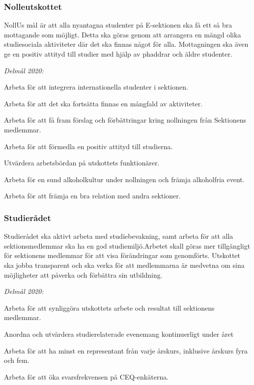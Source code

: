 \documentclass[../_main/handlingar.tex]{subfiles}
\begin{document}
\subsubsection*{Nolleutskottet}
NollUs mål är att alla nyantagna studenter på E-sektionen ska få ett så bra mottagande som möjligt. Detta ska göras genom att arrangera en mängd olika studiesociala aktiviteter där det ska finnas något för alla. Mottagningen ska även ge en positiv attityd till studier med hjälp av phaddrar och äldre studenter. 

\emph{Delmål 2020:}
\begin{dashlist}
	\item Arbeta för att integrera internationella studenter i sektionen. 
	\item Arbeta för att det ska fortsätta finnas en mångfald av aktiviteter.
	\item Arbeta för att få fram förslag och förbättringar kring nollningen från Sektionens medlemmar.
	\item Arbeta för att förmedla en positiv attityd till studierna.
	\item Utvärdera arbetsbördan på utskottets funktionärer.
	\item Arbeta för en sund alkoholkultur under nollningen och främja alkoholfria event.
	\item Arbeta för att främja en bra relation med andra sektioner.
\end{dashlist}

\subsubsection*{Studierådet}
Studierådet ska aktivt arbeta med studiebevakning, samt arbeta för att alla sektionsmedlemmar ska ha en god studiemiljö.Arbetet skall göras mer tillgängligt för sektionens medlemmar för att visa förändringar som genomförts. Utskottet ska jobba transparent och ska verka för att medlemmarna är medvetna  om sina möjligheter att påverka och förbättra sin utbildning.

\emph{Delmål 2020:}
\begin{dashlist}
	\item Arbeta för att synliggöra utskottets arbete och resultat till sektionens medlemmar.
	\item Anordna och utvärdera studierelaterade evenemang kontinuerligt under året
	\item Arbeta för att ha minst en representant från varje årskurs, inklusive årskurs fyra och fem.
	\item Arbeta för att öka svarsfrekvensen på CEQ-enkäterna.
\end{dashlist}

\newpage
\end{document}
